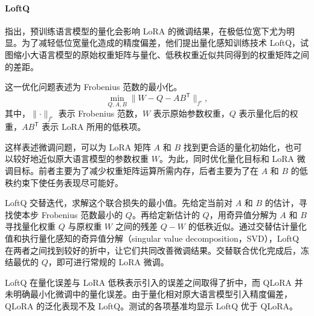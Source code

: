 \paragraph*{LoftQ}
指出，预训练语言模型的量化会影响 LoRA 的微调结果，在极低位宽下尤为明显。为了减轻低位宽量化造成的精度偏差，他们提出量化感知训练技术 LoftQ，试图缩小大语言模型的原始权重矩阵与量化、低秩权重近似共同得到的权重矩阵之间的差距。

这一优化问题表述为 Frobenius 范数的最小化。
\begin{equation}
\min_{Q,A,B}\lVert W-Q-AB^{\mathsf T}\rVert_{f'},
\label{eq:ch04-loftq}
\end{equation}
其中，$\lVert\cdot\rVert_{f'}$ 表示 Frobenius 范数，$W$ 表示原始参数权重，$Q$ 表示量化后的权重，$AB^{\mathsf T}$ 表示 LoRA 所用的低秩项。

这样表述微调问题，可以为 LoRA 矩阵 $A$ 和 $B$ 找到更合适的量化初始化，也可以较好地近似原大语言模型的参数权重 $W$。为此，同时优化量化目标和 LoRA 微调目标。前者主要为了减少权重矩阵运算所需内存，后者主要为了在 $A$ 和 $B$ 的低秩约束下使任务表现尽可能好。

LoftQ 交替迭代，求解这个联合损失的最小值。先给定当前对 $A$ 和 $B$ 的估计，寻找使本步 Frobenius 范数最小的 $Q$。再给定新估计的 $Q$，用奇异值分解为 $A$ 和 $B$ 寻找量化权重 $Q$ 与原权重 $W$ 之间的残差 $Q-W$ 的低秩近似。通过交替估计量化值和执行量化感知的奇异值分解（singular value decomposition，SVD），LoftQ 在两者之间找到较好的折中，让它们共同改善微调结果。交替联合优化完成后，冻结最优的 $Q$，即可进行常规的 LoRA 微调。

LoftQ 在量化误差与 LoRA 低秩表示引入的误差之间取得了折中，而 QLoRA 并未明确最小化微调中的量化误差。由于量化相对原大语言模型引入精度偏差，QLoRA 的泛化表现不及 LoftQ。测试的各项基准均显示 LoftQ 优于 QLoRA。
